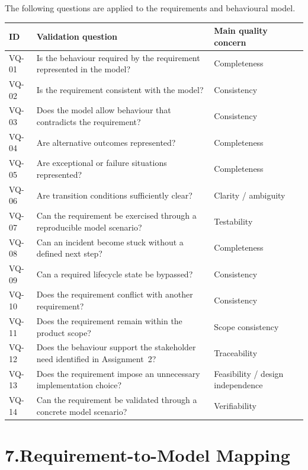 \documentclass[11pt,a4paper]{article}
\begin{document}
The following questions are applied to the requirements and behavioural model.

\begin{center}
\small
\begin{tabularx}{\textwidth}{@{} l X l @{}}
\toprule
\textbf{ID} & \textbf{Validation question} & \textbf{Main quality concern} \\
\midrule
VQ-01 & Is the behaviour required by the requirement represented in the model? & Completeness \\
VQ-02 & Is the requirement consistent with the model? & Consistency \\
VQ-03 & Does the model allow behaviour that contradicts the requirement? & Consistency \\
VQ-04 & Are alternative outcomes represented? & Completeness \\
VQ-05 & Are exceptional or failure situations represented? & Completeness \\
VQ-06 & Are transition conditions sufficiently clear? & Clarity / ambiguity \\
VQ-07 & Can the requirement be exercised through a reproducible model scenario? & Testability \\
VQ-08 & Can an incident become stuck without a defined next step? & Completeness \\
VQ-09 & Can a required lifecycle state be bypassed? & Consistency \\
VQ-10 & Does the requirement conflict with another requirement? & Consistency \\
VQ-11 & Does the requirement remain within the product scope? & Scope consistency \\
VQ-12 & Does the behaviour support the stakeholder need identified in Assignment~2? & Traceability \\
VQ-13 & Does the requirement impose an unnecessary implementation choice? & Feasibility / design independence \\
VQ-14 & Can the requirement be validated through a concrete model scenario? & Verifiability \\
\bottomrule
\end{tabularx}
\end{center}

\section*{7.\enspace Requirement-to-Model Mapping}
\end{document}
